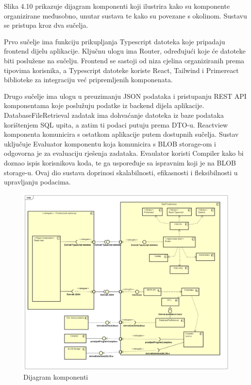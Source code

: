 		
			Slika 4.10 prikazuje dijagram komponenti koji ilustrira kako su komponente organizirane međusobno, unutar sustava te kako su povezane s okolinom. Sustavu se pristupa kroz dva sučelja. 
			
			Prvo sučelje ima funkciju prikupljanja Typescript datoteka koje pripadaju frontend dijelu aplikacije. Ključnu ulogu ima Router, određujući koje će datoteke biti poslužene na sučelju. Frontend se sastoji od niza cjelina organiziranih prema tipovima korisnika, a Typescript datoteke koriste React, Tailwind i Primereact biblioteke za integraciju već pripremljenih komponenata.
			
			Drugo sučelje ima ulogu u preuzimanju JSON podataka i pristupanju REST API komponentama koje poslužuju podatke iz backend dijela aplikacije. DatabaseFileRetrieval zadatak ima dohvaćanje datoteka iz baze podataka korištenjem SQL upita, a zatim ti podaci putuju prema DTO-u. Reactview komponenta komunicira s ostatkom aplikacije putem dostupnih sučelja. Sustav uključuje Evaluator komponentu koja komunicira s BLOB storage-om i odgovorna je za evaluaciju rješenja zadataka. Evaulator koristi Compiler kako bi doznao ispis korisnikova koda, te ga uspoređuje sa ispravnim koji je na BLOB storage-u. Ovaj dio sustava doprinosi skalabilnosti, efikasnosti i fleksibilnosti u upravljanju podacima.
			 
			 \eject
			 
			 \begin{figure}[H]
			 	\includegraphics[scale=0.38]{slike/Dijagram_komp.PNG} %
			 	\centering
			 	\caption{Dijagram komponenti}
			 	\label{fig:komponente}
			 \end{figure}
			 
			 \eject